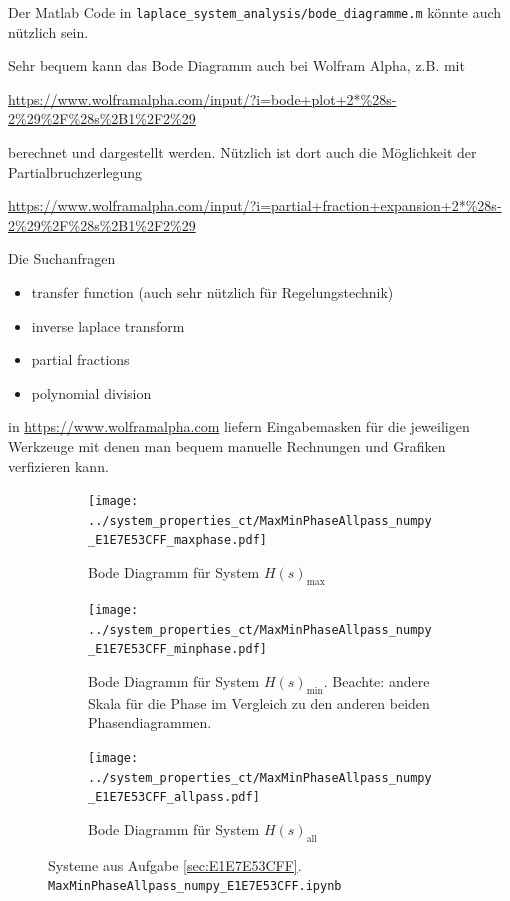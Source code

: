 Der Matlab Code in \texttt{laplace\_system\_analysis/bode\_diagramme.m}
könnte auch nützlich sein.

Sehr bequem kann das Bode Diagramm auch bei Wolfram Alpha, z.B. mit

\url{https://www.wolframalpha.com/input/?i=bode+plot+2*%28s-2%29%2F%28s%2B1%2F2%29}

\noindent  berechnet und dargestellt werden. Nützlich ist dort auch die Möglichkeit
der Partialbruchzerlegung

\url{https://www.wolframalpha.com/input/?i=partial+fraction+expansion+2*%28s-2%29%2F%28s%2B1%2F2%29}

Die Suchanfragen
\begin{itemize}
\item transfer function (auch sehr nützlich für Regelungstechnik)
\item inverse laplace transform
\item partial fractions
\item polynomial division
\end{itemize}
in \url{https://www.wolframalpha.com} liefern Eingabemasken für die jeweiligen
Werkzeuge mit denen man bequem manuelle Rechnungen und Grafiken verfizieren kann.

\clearpage
\begin{figure}[h]
\centering
\begin{subfigure}{0.7\textwidth}
\texttt{[image: ../system\_properties\_ct/MaxMinPhaseAllpass\_numpy\_E1E7E53CFF\_maxphase.pdf]}
\caption{Bode Diagramm für System $H(s)_\mathrm{max}$}
\label{fig:MaxMinPhaseAllpass_numpy_E1E7E53CFF_maxphase}
\end{subfigure}
\begin{subfigure}{0.7\textwidth}
\texttt{[image: ../system\_properties\_ct/MaxMinPhaseAllpass\_numpy\_E1E7E53CFF\_minphase.pdf]}
\caption{Bode Diagramm für System $H(s)_\mathrm{min}$.
%
Beachte: andere Skala für die Phase im Vergleich zu den anderen beiden Phasendiagrammen.}
\label{fig:MaxMinPhaseAllpass_numpy_E1E7E53CFF_minphase}
\end{subfigure}
\begin{subfigure}{0.7\textwidth}
\texttt{[image: ../system\_properties\_ct/MaxMinPhaseAllpass\_numpy\_E1E7E53CFF\_allpass.pdf]}
\caption{Bode Diagramm für System $H(s)_\mathrm{all}$}
\label{fig:MaxMinPhaseAllpass_numpy_E1E7E53CFF_allpass}
\end{subfigure}
\caption{Systeme aus Aufgabe \ref{sec:E1E7E53CFF}. \texttt{MaxMinPhaseAllpass\_numpy\_E1E7E53CFF.ipynb}}
\label{fig:MaxMinPhaseAllpass_numpy_E1E7E53CFF}
\end{figure}
\clearpage


